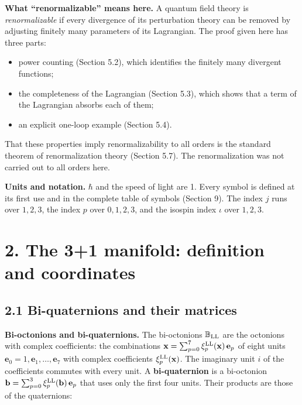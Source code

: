 \documentclass[
  10pt,
]{article}
\providecommand{\tightlist}{%
  \setlength{\itemsep}{0pt}\setlength{\parskip}{0pt}}
\begin{document}
\textbf{What ``renormalizable'' means here.} A quantum field theory is
\emph{renormalizable} if every divergence of its perturbation theory can
be removed by adjusting finitely many parameters of its Lagrangian. The
proof given here has three parts:

\begin{itemize}
\tightlist
\item
  power counting (Section 5.2), which identifies the finitely many
  divergent functions;
\item
  the completeness of the Lagrangian (Section 5.3), which shows that a
  term of the Lagrangian absorbs each of them;
\item
  an explicit one-loop example (Section 5.4).
\end{itemize}

That these properties imply renormalizability to all orders is the
standard theorem of renormalization theory (Section 5.7). The
renormalization was not carried out to all orders here.

\textbf{Units and notation.} \(\hbar\) and the speed of light are 1.
Every symbol is defined at its first use and in the complete table of
symbols (Section 9). The index \(j\) runs over \(1,2,3\), the index
\(p\) over \(0,1,2,3\), and the isospin index \(\iota\) over \(1,2,3\).

\hypertarget{the-31-manifold-definition-and-coordinates}{%
\section{2. The 3+1 manifold: definition and
coordinates}\label{the-31-manifold-definition-and-coordinates}}

\hypertarget{bi-quaternions-and-their-matrices}{%
\subsection{2.1 Bi-quaternions and their
matrices}\label{bi-quaternions-and-their-matrices}}

\textbf{Bi-octonions and bi-quaternions.} The bi-octonions
\(\mathbb B_{\rm LL}\) are the octonions with complex coefficients: the
combinations
\(\mathbf x=\sum_{p=0}^7\xi^{\rm LL}_p(\mathbf x)\,\mathbf e_p\) of
eight units \(\mathbf e_0=1,\mathbf e_1,\dots,\mathbf e_7\) with complex
coefficients \(\xi^{\rm LL}_p(\mathbf x)\). The imaginary unit \(i\) of
the coefficients commutes with every unit. A \textbf{bi-quaternion} is a
bi-octonion
\(\mathbf b=\sum_{p=0}^3\xi^{\rm LL}_p(\mathbf b)\,\mathbf e_p\) that
uses only the first four units. Their products are those of the
quaternions:
\end{document}
